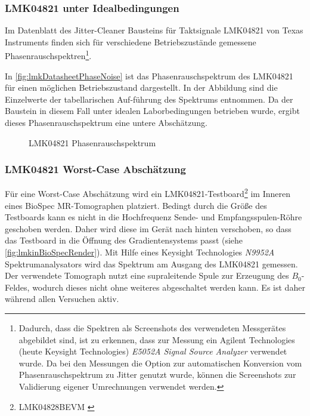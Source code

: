 \subsubsection{LMK04821 unter Idealbedingungen}
Im Datenblatt des Jitter-Cleaner Bausteins für Taktsignale LMK04821 von Texas Instruments \cite{lmkDatasheet} finden sich für verschiedene Betriebszustände gemessene Phasenrauschspektren\footnote{Dadurch, dass die Spektren als Screenshots des verwendeten Messgerätes abgebildet sind, ist zu erkennen, dass zur Messung ein Agilent Technologies (heute Keysight Technologies) \textit{E5052A Signal Source Analyzer} verwendet wurde. Da bei den Messungen die Option zur automatischen Konversion vom Phasenrauschspektrum zu Jitter genutzt wurde, können die Screenshots zur Validierung eigener Umrechnungen verwendet werden.}.  

In \autoref{fig:lmkDatasheetPhaseNoise} ist das Phasenrauschspektrum des LMK04821 für einen möglichen Betriebszustand dargestellt. In der Abbildung sind die Einzelwerte der tabellarischen Auf-führung des Spektrums entnommen. Da der Baustein in diesem Fall unter idealen Laborbedingungen betrieben wurde, ergibt dieses Phasenrauschspektrum eine untere Abschätzung.

\begin{figure}[H]
	\centering
	\caption[LMK08421 Phasenrauschspektrum]{LMK04821 Phasenrauschspektrum \cite[S.~24, Figure 2]{lmkDatasheet}}
	\label{fig:lmkDatasheetPhaseNoise}
\end{figure}


\subsubsection{LMK04821 Worst-Case Abschätzung}
Für eine Worst-Case Abschätzung wird ein LMK04821-Testboard\footnote{LMK04828BEVM \cite{lmkEvalboard}} im Inneren eines BioSpec MR-Tomographen platziert. Bedingt durch die Größe des Testboards kann es nicht in die Hochfrequenz Sende- und Empfangsspulen-Röhre geschoben werden. Daher wird diese im Gerät nach hinten verschoben, so dass das Testboard in die Öffnung des Gradientensystems passt (siehe \autoref{fig:lmkinBioSpecRender}). Mit Hilfe eines Keysight Technologies \textit{N9952A} Spektrumanalysators wird das Spektrum am Ausgang des LMK04821 gemessen. Der verwendete Tomograph nutzt eine supraleitende Spule zur Erzeugung des $B_0$-Feldes, wodurch dieses nicht ohne weiteres abgeschaltet werden kann. Es ist daher während allen Versuchen aktiv.

